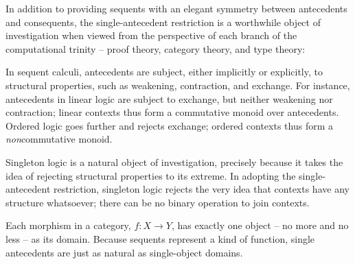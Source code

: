 In addition to providing sequents with an elegant symmetry between antecedents and consequents, the single-antecedent restriction is a worthwhile object of investigation when viewed from the perspective of each branch of the computational trinity\autocite{Harper:??} -- proof theory, category theory, and type theory:
%
\begin{description}[parsep=0pt, listparindent=\parindent]
\item[Proof theory]
  In sequent calculi, antecedents are subject, either implicitly or explicitly, to structural properties, such as weakening, contraction, and exchange.
  For instance, antecedents in linear logic are subject to exchange, but neither weakening nor contraction; linear contexts thus form a commutative monoid over antecedents.
  Ordered logic goes further and rejects exchange; ordered contexts thus form a \emph{non}\-commutative monoid.


  Singleton logic is a natural object of investigation, precisely because it takes the idea of rejecting structural properties to its extreme.
  In adopting the single-antecedent restriction, singleton logic rejects the very idea that contexts have any structure whatsoever; there can be no binary operation to join contexts.

\item[Category theory]
  Each morphism in a category, $f\colon X \rightarrow Y$, has exactly one object -- no more and no less -- as its domain.
  Because sequents represent a kind of function, single antecedents are just as natural as single-object domains.


\end{description}
